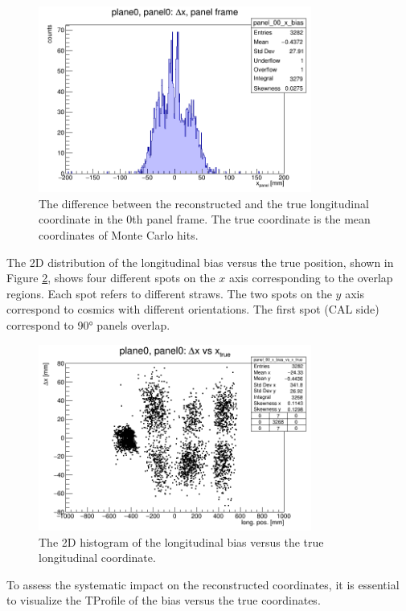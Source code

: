 \begin{figure}[!h]
    \centering
    \includegraphics[width=0.8\textwidth]{figures/png/panel_00_x_bias.png}
    \caption{The difference between the reconstructed and the true longitudinal coordinate in the 0th panel frame. 
    The true coordinate is the mean coordinates of Monte Carlo hits.}
    \label{fig:bias}
\end{figure}
The 2D distribution of the longitudinal bias versus the true position, shown in 
Figure \ref{fig:rec2D}, shows four different spots on the $x$ axis corresponding to 
the overlap regions. Each spot refers to different straws. The two spots on the $y$ axis correspond to cosmics with different orientations. 
The first spot (CAL side) correspond to 90° panels overlap.
\begin{figure}[!h]
    \centering
    \includegraphics[width=0.8\textwidth]{figures/png/panel_00_x_bias_vs_x.png}
    \caption{The 2D histogram of the longitudinal bias versus the true longitudinal coordinate.}
    \label{fig:rec2D}
\end{figure}
To assess the systematic impact on the reconstructed coordinates, it is essential to visualize the TProfile of the bias versus the true coordinates. 
